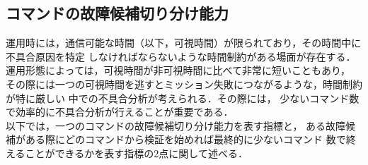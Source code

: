 \documentclass[11pt]{jsreport}
\begin{document}
\subsection{コマンドの故障候補切り分け能力}
運用時には，通信可能な時間（以下，可視時間）が限られており，その時間中に不具合原因を特定
しなければならないような時間制約がある場面が存在する．
運用形態によっては，可視時間が非可視時間に比べて非常に短いこともあり，
その際には一つの可視時間を逃すとミッション失敗につながるような，時間制約が特に厳しい
中での不具合分析が考えられる．その際には，
少ないコマンド数で効率的に不具合分析が行えることが重要である．\\
以下では，一つのコマンドの故障候補切り分け能力を表す指標と，
ある故障候補がある際にどのコマンドから検証を始めれば最終的に少ないコマンド
数で終えることができるかを表す指標の2点に関して述べる．
\end{document}
